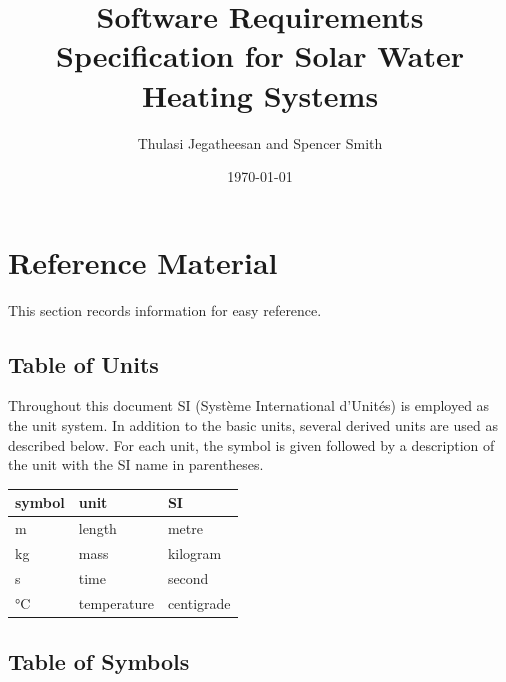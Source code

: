 \documentclass[12pt]{article}
\begin{document}
\title{Software Requirements Specification for Solar Water Heating Systems} 
\author{Thulasi Jegatheesan and Spencer Smith}
\date{\today}
	
\maketitle

\tableofcontents

\section{Reference Material}

This section records information for easy reference.

\subsection{Table of Units}

Throughout this document SI (Syst\`{e}me International d'Unit\'{e}s) is employed
as the unit system.  In addition to the basic units, several derived units are
used as described below.  For each unit, the symbol is given followed by a
description of the unit with the SI name in parentheses.
~\newline

\renewcommand{\arraystretch}{1.2}
  \noindent \begin{tabular}{l l l} 
    \toprule		
    \textbf{symbol} & \textbf{unit} & \textbf{SI}\\
    \midrule 
    \si{\meter} & length & metre\\
    \si{\kilogram} & mass	& kilogram\\
    \si{\second} & time & second\\
    \si{\celsius} & temperature & centigrade\\
    \bottomrule
  \end{tabular}

\subsection{Table of Symbols}
\end{document}
